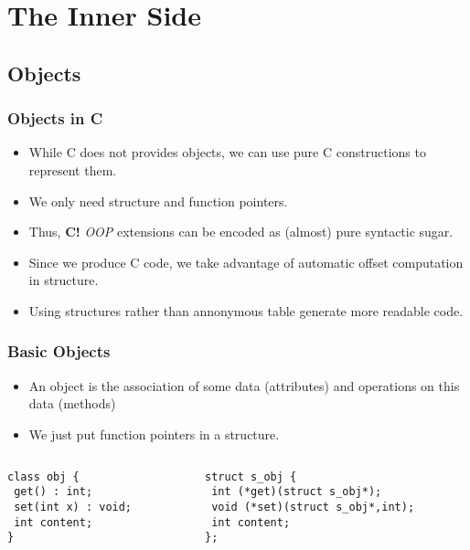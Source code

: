 \documentclass{beamer}
\newcommand{\cbang}{{\bf C!}}
\begin{document}
\section{The Inner Side}

\subsection{Objects}

\begin{frame}
  \frametitle{Objects in C}
  \begin{itemize}
  \item While C does not provides objects, we can use pure C constructions to
    represent them.
  \item We only need structure and function pointers.
  \item Thus, \cbang{} \emph{OOP} extensions can be encoded as (almost) pure
    syntactic sugar.
  \item Since we produce C code, we take advantage of automatic offset
    computation in structure.
  \item Using structures rather than annonymous table generate more readable
    code.
  \end{itemize}
\end{frame}

\begin{frame}[fragile]
  \frametitle{Basic Objects}
  \begin{itemize}
  \item An object is the association of some data (attributes) and operations
    on this data (methods)
  \item We just put function pointers in a structure.
  \end{itemize}
  \begin{BoxedExample}
    \footnotesize
    \begin{columns}
      \begin{column}{3.5cm}
\begin{lstlisting}
class obj {
 get() : int;
 set(int x) : void;
 int content;
}
\end{lstlisting}
      \end{column}
      \begin{column}{6cm}
\begin{lstlisting}
struct s_obj {
 int (*get)(struct s_obj*);
 void (*set)(struct s_obj*,int);
 int content;
};
\end{lstlisting}
      \end{column}
    \end{columns}
  \end{BoxedExample}

\end{frame}
\end{document}
